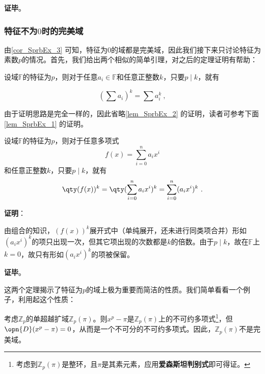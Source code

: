 \textbf{证毕}。









\subsubsection{特征不为$0$时的完美域}


由\autoref{cor_SprbEx_3} 可知，特征为$0$的域都是完美域，因此我们接下来只讨论特征为素数$p$的情况。首先，我们给出两个相似的简单引理，对之后的定理证明有帮助：


\begin{lemma}{}\label{lem_SprbEx_2}
设域$\mathbb{F}$的特征为$p$，则对于任意$a_i\in\mathbb{F}$和任意正整数$k$，只要$p\mid k$，就有

\begin{equation}
(\sum a_i)^k = \sum a_i^k~,
\end{equation}

\end{lemma}

由于证明思路是完全一样的，因此省略\autoref{lem_SprbEx_2} 的证明，读者可参考下面\autoref{lem_SprbEx_1} 的证明。


\begin{lemma}{}\label{lem_SprbEx_1}
设域$\mathbb{F}$的特征为$p$，则对于任意多项式
\begin{equation}
f(x) = \sum_{i=0}^n a_ix^i
\end{equation}
和任意正整数$k$，只要$p\mid k$，就有
\begin{equation}
\qty(f(x))^k = \qty(\sum_{i=0}^n a_ix^i)^k = \sum_{i=0}^n (a_ix^i)^k~.
\end{equation}
\end{lemma}

\textbf{证明}：

由组合的知识，$(f(x))^k$展开式中（单纯展开，还未进行同类项合并）形如$(a_ix^i)^k$的项只出现一次，但其它项出现的次数都是$k$的倍数。由于$p\mid k$，故在$\mathbb{F}$上$k=0$，故只有形如$(a_ix^i)^k$的项被保留。

\textbf{证毕}。


这两个定理揭示了特征为$p$的域上极为重要而简洁的性质。我们简单看看一个例子，利用起这个性质：




\begin{example}{}\label{ex_SprbEx_2}
考虑$\mathbb{Z}_p$的单超越扩域$\mathbb{Z}_p(\pi)$。则$x^p-\pi$是$\mathbb{Z}_p(\pi)$上的不可约多项式\footnote{考虑到$\mathbb{Z}_p(\pi)$是整环，且$\pi$是其素元素，应用\textbf{爱森斯坦判别式}即可得证。}，但$\opn{D}(x^p-\pi)=0$，从而是一个不可分的不可约多项式。因此，$\mathbb{Z}_p(\pi)$不是完美域。

\end{example}



